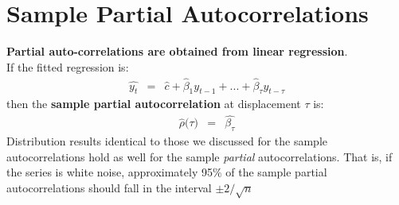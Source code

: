 \section{Sample Partial Autocorrelations}
\textbf{\color{blue}Partial auto-correlations are obtained from linear regression}.\\
If the fitted regression is:
\begin{eqnarray}
	\hat{y_{t}} &=& \hat{c} + \hat{\beta}_{1}y_{t - 1} + ... + \hat{\beta}_{\tau}y_{t - \tau} 
\end{eqnarray}
then the \textbf{\color{blue}sample partial autocorrelation} at displacement $\tau$ is:
\begin{eqnarray}
\hat{\rho}\big(\tau\big) &=& \hat{\beta_{\tau}}
\end{eqnarray}
Distribution results identical to those we discussed for the sample autocorrelations hold as well for the sample \textit{partial} autocorrelations. That is, if the series is white noise, approximately 95$\%$ of the sample partial autocorrelations should fall in the interval $\pm2/\sqrt{n}$
 


